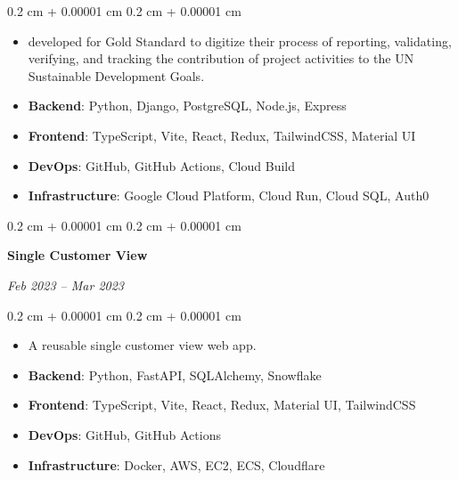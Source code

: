 \documentclass[10pt, a4paper]{article}
\newenvironment{highlights}{
    \begin{itemize}[
        topsep=0.10 cm,
        parsep=0.10 cm,
        partopsep=0pt,
        itemsep=0pt,
        leftmargin=0.4 cm + 10pt
    ]
}{
    \end{itemize}
} %
\newenvironment{onecolentry}{
    \begin{adjustwidth}{
        0.2 cm + 0.00001 cm
    }{
        0.2 cm + 0.00001 cm
    }
}{
    \end{adjustwidth}
} %
\newenvironment{twocolentry}[2][]{
    \onecolentry
    \def\secondColumn{#2}
    \setcolumnwidth{\fill, 4.5 cm}
    \begin{paracol}{2}
}{
    \switchcolumn \raggedleft \secondColumn
    \end{paracol}
    \endonecolentry
} %
\let\hrefWithoutArrow\href
\renewcommand{\href}[2]{\hrefWithoutArrow{#1}{\ifthenelse{\equal{#2}{}}{ }{#2 }\raisebox{.15ex}{\footnotesize \faExternalLink*}}}
\begin{document}
        \vspace{0.10 cm}
        \begin{onecolentry}
            \begin{highlights}
                \item \href{https://sdg-tool.goldstandard.org}{Web app} developed for Gold Standard to digitize their process of  reporting, validating, verifying, and tracking the contribution of project activities to the UN Sustainable  Development Goals.

                \item \textbf{Backend}: Python, Django, PostgreSQL, Node.js, Express
                \item \textbf{Frontend}: TypeScript, Vite, React, Redux, TailwindCSS, Material UI
                \item \textbf{DevOps}: GitHub, GitHub Actions, Cloud Build
                \item \textbf{Infrastructure}: Google Cloud Platform, Cloud Run, Cloud SQL, Auth0
            \end{highlights}
        \end{onecolentry}


        \vspace{0.2 cm}

        \begin{twocolentry}{
            
            
        \textit{Feb 2023 – Mar 2023}}
            \textbf{Single Customer View}
        \end{twocolentry}

        \vspace{0.10 cm}
        \begin{onecolentry}
            \begin{highlights}
                \item A reusable single customer view web app.
                \item \textbf{Backend}: Python, FastAPI, SQLAlchemy, Snowflake
                \item \textbf{Frontend}: TypeScript, Vite, React, Redux, Material UI, TailwindCSS
                \item \textbf{DevOps}: GitHub, GitHub Actions
                \item \textbf{Infrastructure}: Docker, AWS, EC2, ECS, Cloudflare
            \end{highlights}
        \end{onecolentry}
\end{document}

